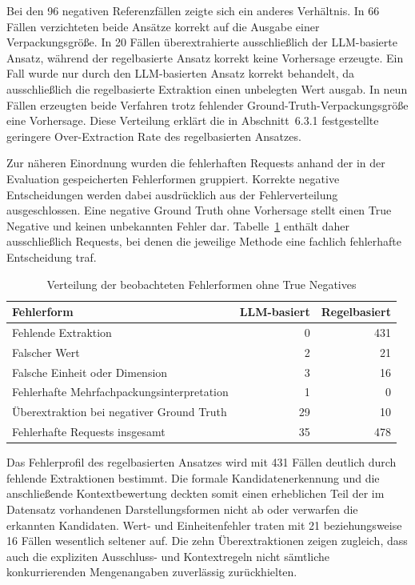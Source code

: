 Bei den 96 negativen Referenzfällen zeigte sich ein anderes Verhältnis. In 66 Fällen verzichteten beide Ansätze korrekt auf die Ausgabe einer Verpackungsgröße. In 20 Fällen überextrahierte ausschließlich der LLM-basierte Ansatz, während der regelbasierte Ansatz korrekt keine Vorhersage erzeugte. Ein Fall wurde nur durch den LLM-basierten Ansatz korrekt behandelt, da ausschließlich die regelbasierte Extraktion einen unbelegten Wert ausgab. In neun Fällen erzeugten beide Verfahren trotz fehlender Ground-Truth-Verpackungsgröße eine Vorhersage. Diese Verteilung erklärt die in Abschnitt~6.3.1 festgestellte geringere Over-Extraction Rate des regelbasierten Ansatzes.

Zur näheren Einordnung wurden die fehlerhaften Requests anhand der in der Evaluation gespeicherten Fehlerformen gruppiert. Korrekte negative Entscheidungen werden dabei ausdrücklich aus der Fehlerverteilung ausgeschlossen. Eine negative Ground Truth ohne Vorhersage stellt einen True Negative und keinen unbekannten Fehler dar. Tabelle~\ref{tab:fehlerverteilung-ansaetze} enthält daher ausschließlich Requests, bei denen die jeweilige Methode eine fachlich fehlerhafte Entscheidung traf.

\begin{table}[htbp]
    \centering
    \small
    \begin{tabular}{p{} r r}
        \hline
        \textbf{Fehlerform} &
        \textbf{LLM-basiert} &
        \textbf{Regelbasiert} \\
        \hline
        Fehlende Extraktion & 0 & 431 \\
        Falscher Wert & 2 & 21 \\
        Falsche Einheit oder Dimension & 3 & 16 \\
        Fehlerhafte Mehrfachpackungsinterpretation & 1 & 0 \\
        Überextraktion bei negativer Ground Truth & 29 & 10 \\
        \hline
        Fehlerhafte Requests insgesamt & 35 & 478 \\
        \hline
    \end{tabular}
    \caption{Verteilung der beobachteten Fehlerformen ohne True Negatives}
    \label{tab:fehlerverteilung-ansaetze}
\end{table}

Das Fehlerprofil des regelbasierten Ansatzes wird mit 431 Fällen deutlich durch fehlende Extraktionen bestimmt. Die formale Kandidatenerkennung und die anschließende Kontextbewertung deckten somit einen erheblichen Teil der im Datensatz vorhandenen Darstellungsformen nicht ab oder verwarfen die erkannten Kandidaten. Wert- und Einheitenfehler traten mit 21 beziehungsweise 16 Fällen wesentlich seltener auf. Die zehn Überextraktionen zeigen zugleich, dass auch die expliziten Ausschluss- und Kontextregeln nicht sämtliche konkurrierenden Mengenangaben zuverlässig zurückhielten.

